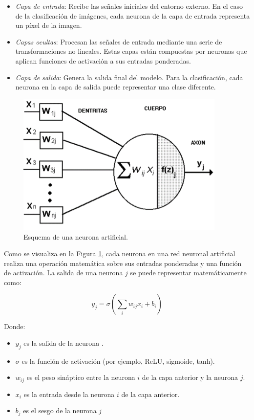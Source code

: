 \documentclass[conference]{IEEEtran}
\begin{document}
\begin{itemize}
	\item \textit{Capa de entrada}: Recibe las señales iniciales del entorno externo. En el caso de la clasificación de imágenes, cada neurona de la capa de entrada representa un píxel de la imagen.
	\item \textit{Capas ocultas}: Procesan las señales de entrada mediante una serie de transformaciones no lineales. Estas capas están compuestas por neuronas que aplican funciones de activación a sus entradas ponderadas.
	\item \textit{Capa de salida}: Genera la salida final del modelo. Para la clasificación, cada neurona en la capa de salida puede representar una clase diferente.
\end{itemize}

\begin{figure}[ht]
	\centering
	\includegraphics[scale=0.55]{img/Neuron.png}
	\caption{Esquema de una neurona artificial.
		\label{fig:neuron}}
\end{figure}

Como se visualiza en la Figura \ref{fig:neuron}, cada neurona en una red neuronal artificial realiza una operación matemática sobre sus entradas ponderadas y una función de activación. La salida de una neurona $j$ se puede representar matemáticamente como:

\begin{equation}
	y_{j} = \sigma \left( \sum_{i} w_{ij}x_{i} + b_{i} \right)
	\label{eq:1}
\end{equation}

Donde:

\begin{itemize}
	\item $y_{j}$ es la salida de la neurona .
	\item $\sigma$ es la función de activación (por ejemplo, ReLU, sigmoide, tanh).
	\item $w_{ij}$ es el peso sináptico entre la neurona $i$ de la capa anterior y la neurona $j$.
	\item $x_{i}$ es la entrada desde la neurona $i$ de la capa anterior.
	\item $b_{j}$ es el sesgo de la neurona $j$
\end{itemize}
\end{document}
